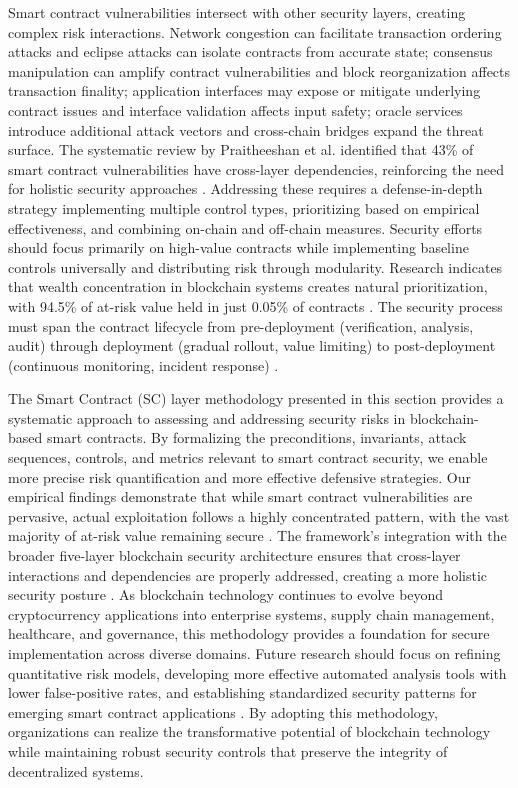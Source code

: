 Smart contract vulnerabilities intersect with other security layers, creating complex risk interactions. Network congestion can facilitate transaction ordering attacks and eclipse attacks can isolate contracts from accurate state; consensus manipulation can amplify contract vulnerabilities and block reorganization affects transaction finality; application interfaces may expose or mitigate underlying contract issues and interface validation affects input safety; oracle services introduce additional attack vectors and cross-chain bridges expand the threat surface. The systematic review by Praitheeshan et al. identified that 43\% of smart contract vulnerabilities have cross-layer dependencies, reinforcing the need for holistic security approaches \cite{praitheeshan2019systematic}. Addressing these requires a defense-in-depth strategy implementing multiple control types, prioritizing based on empirical effectiveness, and combining on-chain and off-chain measures. Security efforts should focus primarily on high-value contracts while implementing baseline controls universally and distributing risk through modularity. Research indicates that wealth concentration in blockchain systems creates natural prioritization, with 94.5\% of at-risk value held in just 0.05\% of contracts \cite{perez2021analysis}. The security process must span the contract lifecycle from pre-deployment (verification, analysis, audit) through deployment (gradual rollout, value limiting) to post-deployment (continuous monitoring, incident response) \cite{Wang2019}.

The Smart Contract (SC) layer methodology presented in this section provides a systematic approach to assessing and addressing security risks in blockchain-based smart contracts. By formalizing the preconditions, invariants, attack sequences, controls, and metrics relevant to smart contract security, we enable more precise risk quantification and more effective defensive strategies. Our empirical findings demonstrate that while smart contract vulnerabilities are pervasive, actual exploitation follows a highly concentrated pattern, with the vast majority of at-risk value remaining secure \cite{perez2021analysis,zhou2023sok}. The framework's integration with the broader five-layer blockchain security architecture ensures that cross-layer interactions and dependencies are properly addressed, creating a more holistic security posture \cite{Wang2019}. As blockchain technology continues to evolve beyond cryptocurrency applications into enterprise systems, supply chain management, healthcare, and governance, this methodology provides a foundation for secure implementation across diverse domains. Future research should focus on refining quantitative risk models, developing more effective automated analysis tools with lower false-positive rates, and establishing standardized security patterns for emerging smart contract applications \cite{praitheeshan2019systematic}. By adopting this methodology, organizations can realize the transformative potential of blockchain technology while maintaining robust security controls that preserve the integrity of decentralized systems.


